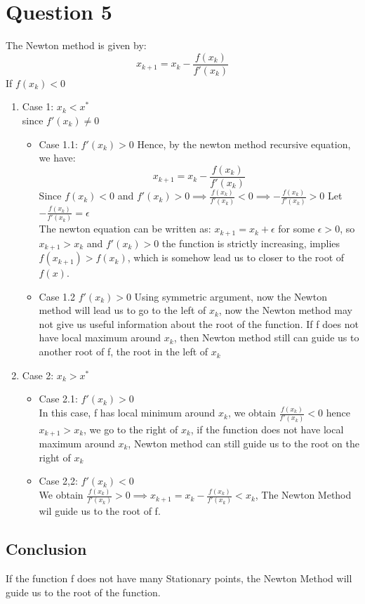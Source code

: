 \documentclass[11pt]{article}
\newcommand{\1}{\mathbbm{1}}
\begin{document}
\section{Question 5}
The Newton method is given by:
$$x_{k+1} = x_k -\frac{f(x_k)}{f'(x_k)}$$
If $f(x_k) < 0$\\
\begin{enumerate}

\item Case 1: $ x_k < x^* $\\
since $f'(x_k) \neq 0 $
\begin{itemize}
\item Case 1.1: $f'(x_k) > 0 $
Hence, by the newton method recursive equation, we have:
$$x_{k+1} = x_k -\frac{f(x_k)}{f'(x_k)}$$
Since $f(x_k) <0$ and $f'(x_k) > 0 \implies \frac{f(x_k)}{f'(x_k)} < 0 \implies -\frac{f(x_k)}{f'(x_k)}>0$
Let $-\frac{f(x_k)}{f'(x_k)} = \epsilon$\\
The newton equation can be written as:
$x_{k+1} = x_k + \epsilon$ for some $\epsilon >0$, so $x_{k+1}>x_k$ and $f'(x_k) > 0$ the function is strictly increasing, implies $f(x_{k+1}) > f(x_k)$, which is somehow lead us to closer to the root of $f(x)$.
\item Case 1.2 $f'(x_k) > 0$
Using symmetric argument, now the Newton method will lead us to go to the left of $x_k$, now the Newton method may not give us useful information about the root of the function. 
If f does not have local maximum around $x_k$, then Newton method still can guide us to another root of f, the root in the left of $x_k$


\end{itemize}
\item Case 2: $x_k > x^*$

\begin{itemize}
\item Case 2.1: $f'(x_k) > 0 $\\
In this case, f has local minimum around $x_k$, we obtain $\frac{f(x_k)}{f'(x_k)} < 0$ hence $x_{k+1} > x_k$, we go to the right of $x_k$, if the function does not have local maximum around $x_k$, Newton method can still guide us to the root on the right of $x_k$

\item Case 2,2:  $f'(x_k) < 0 $\\
We obtain $\frac{f(x_k)}{f'(x_k)} > 0 \implies x_{k+1} = x_k -\frac{f(x_k)}{f'(x_k)} < x_k$, The Newton Method wil guide us to the root of f.

\end{itemize}




\end{enumerate}

\subsection{Conclusion}
If the function f does not have many Stationary points, the Newton Method will guide us to the root of the function.
\end{document}
